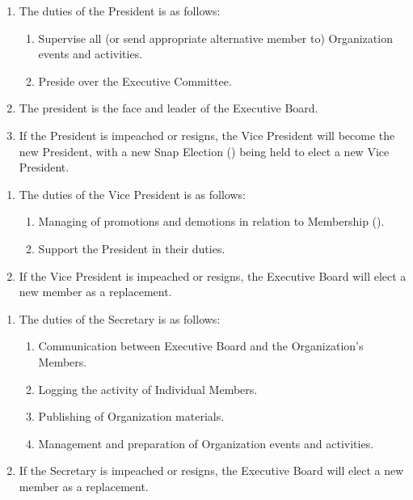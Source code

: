 
\begin{enumerate}
	\item The duties of the President is as follows:
		\begin{enumerate}
			\item Supervise all (or send appropriate alternative member to) Organization
				events and activities.

			\item Preside over the Executive Committee.
		\end{enumerate}

	\item The president is the face and leader of the Executive Board.

	\item If the President is impeached or resigns, the Vice President will become
		the new President, with a new Snap Election ()
		being held to elect a new Vice President.
\end{enumerate}

\begin{enumerate}
	\item The duties of the Vice President is as follows:
		\begin{enumerate}
			\item Managing of promotions and demotions in relation to Membership ().

			\item Support the President in their duties.
		\end{enumerate}

	\item If the Vice President is impeached or resigns, the Executive Board will
		elect a new member as a replacement.
\end{enumerate}

\begin{enumerate}
	\item The duties of the Secretary is as follows:
		\begin{enumerate}
			\item Communication between Executive Board and the Organization's Members.

			\item Logging the activity of Individual Members.

			\item Publishing of Organization materials.

			\item Management and preparation of Organization events and activities.
		\end{enumerate}

	\item If the Secretary is impeached or resigns, the Executive Board will elect
		a new member as a replacement.
\end{enumerate}

